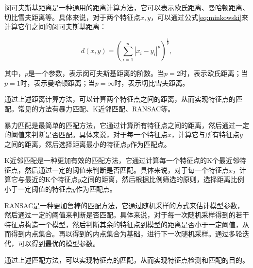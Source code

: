 闵可夫斯基距离是一种通用的距离计算方法，它可以表示欧氏距离、曼哈顿距离、切比雪夫距离等。具体来说，对于两个特征点$x, y$，可以通过公式\ref{eq:minkowski}来计算它们之间的闵可夫斯基距离：

\begin{equation}
    d(x, y) = \left( \sum_{i=1}^{n} |x_i - y_i|^p \right)^{\frac{1}{p}},
    \label{eq:minkowski}
\end{equation}

其中，$p$是一个参数，表示闵可夫斯基距离的阶数。当$p=2$时，表示欧氏距离；当$p=1$时，表示曼哈顿距离；当$p=\infty$时，表示切比雪夫距离。

通过上述距离计算方法，可以计算两个特征点之间的距离，从而实现特征点的匹配。常见的方法有暴力匹配、K近邻匹配、RANSAC等。

暴力匹配是最简单的匹配方法，它通过计算所有特征点之间的距离，然后通过一定的阈值来判断是否匹配。具体来说，对于每一个特征点$x$，计算它与所有特征点$y$之间的距离，然后选择距离最小的特征点$y$作为匹配点。

K近邻匹配是一种更加有效的匹配方法，它通过计算每一个特征点的K个最近邻特征点，然后通过一定的阈值来判断是否匹配。具体来说，对于每一个特征点$x$，计算它与最近的K个特征点$y$之间的距离，然后根据比例筛选的原则，选择距离比例小于一定阈值的特征点$y$作为匹配点。

RANSAC是一种更加鲁棒的匹配方法，它通过随机采样的方式来估计模型参数，然后通过一定的阈值来判断是否匹配。具体来说，对于每一次随机采样得到的若干特征点构造一个模型，然后判断其余的特征点到模型的距离是否小于一定阈值，从而得到内点集合。再以得到的内点集合为基础，进行下一次随机采样。通过多轮迭代，可以得到最优的模型参数。

通过上述匹配方法，可以实现特征点的匹配，从而实现特征点检测和匹配的目的。
